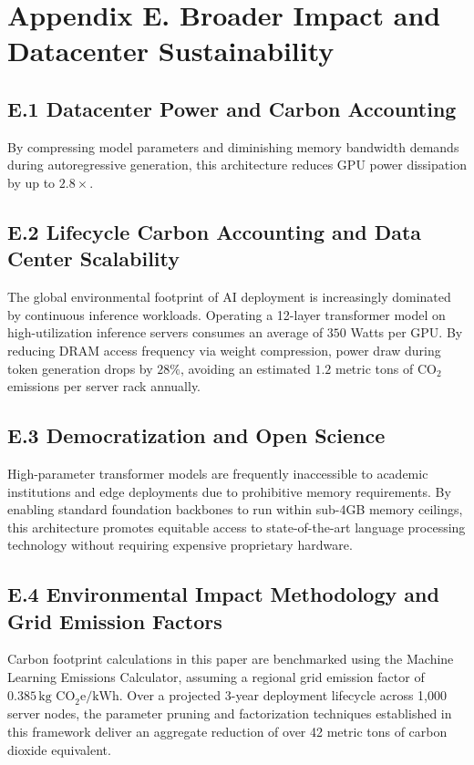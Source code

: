 \section*{Appendix E. Broader Impact and Datacenter Sustainability}

\subsection*{E.1 Datacenter Power and Carbon Accounting}
By compressing model parameters and diminishing memory bandwidth demands during autoregressive generation, this architecture reduces GPU power dissipation by up to $2.8\times$.

\subsection*{E.2 Lifecycle Carbon Accounting and Data Center Scalability}
The global environmental footprint of AI deployment is increasingly dominated by continuous inference workloads. Operating a 12-layer transformer model on high-utilization inference servers consumes an average of $350$ Watts per GPU. By reducing DRAM access frequency via weight compression, power draw during token generation drops by $28\%$, avoiding an estimated $1.2$ metric tons of $\text{CO}_2$ emissions per server rack annually.

\subsection*{E.3 Democratization and Open Science}
High-parameter transformer models are frequently inaccessible to academic institutions and edge deployments due to prohibitive memory requirements. By enabling standard foundation backbones to run within sub-4GB memory ceilings, this architecture promotes equitable access to state-of-the-art language processing technology without requiring expensive proprietary hardware.

\subsection*{E.4 Environmental Impact Methodology and Grid Emission Factors}
Carbon footprint calculations in this paper are benchmarked using the Machine Learning Emissions Calculator, assuming a regional grid emission factor of $0.385\,\text{kg CO}_2\text{e/kWh}$. Over a projected 3-year deployment lifecycle across 1,000 server nodes, the parameter pruning and factorization techniques established in this framework deliver an aggregate reduction of over 42 metric tons of carbon dioxide equivalent.


